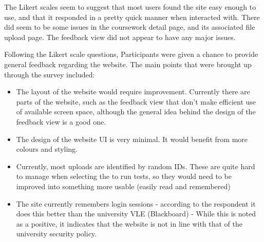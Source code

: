 \documentclass[a4paper,11pt]{report}
\begin{document}
The Likert scales seem to suggest that most users found the site easy enough to use, and that it responded in a pretty quick manner when interacted with. There did seem to be some issues in the coursework detail page, and its associated file upload page. The feedback view did not appear to have any major issues.\par
Following the Likert scale questions, Participants were given a chance to provide general feedback regarding the website. The main points that were brought up through the survey included:
\begin{itemize}
\item The layout of the website would require improvement. Currently there are parts of the website, such as the feedback view that don't make efficient use of available screen space, although the general idea behind the design of the feedback view is a good one.
\item The design of the website UI is very minimal. It would benefit from more colours and styling.
\item Currently, most uploads are identified by random IDs. These are quite hard to manage when selecting the to run tests, so they would need to be improved into something more usable (easily read and remembered)
\item The site currently remembers login sessions - according to the respondent it does this better than the university VLE (Blackboard) - While this is noted as a positive, it indicates that the website is not in line with that of the university security policy.
\end{itemize}
\end{document}
